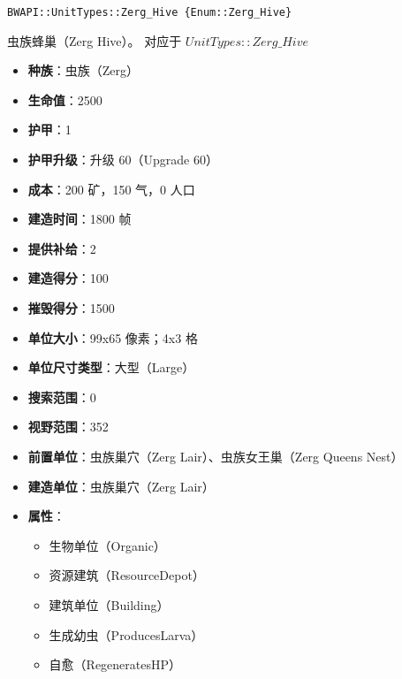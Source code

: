 \begin{tcolorbox}[colback=white, colframe=black!60!white, title=Zerg\_Hive(), arc=0mm]
    \begin{verbatim}
BWAPI::UnitTypes::Zerg_Hive {Enum::Zerg_Hive}
    \end{verbatim}
    虫族蜂巢（Zerg Hive）。
    对应于  $UnitTypes::Zerg\_Hive$ 
    \begin{itemize}
        \item \textbf{种族}：虫族（Zerg）
        \item \textbf{生命值}：2500
        \item \textbf{护甲}：1
        \item \textbf{护甲升级}：升级 60（Upgrade 60）
        \item \textbf{成本}：200 矿，150 气，0 人口
        \item \textbf{建造时间}：1800 帧
        \item \textbf{提供补给}：2
        \item \textbf{建造得分}：100
        \item \textbf{摧毁得分}：1500
        \item \textbf{单位大小}：99x65 像素；4x3 格
        \item \textbf{单位尺寸类型}：大型（Large）
        \item \textbf{搜索范围}：0
        \item \textbf{视野范围}：352
        \item \textbf{前置单位}：虫族巢穴（Zerg Lair）、虫族女王巢（Zerg Queens Nest）
        \item \textbf{建造单位}：虫族巢穴（Zerg Lair）
        \item \textbf{属性}：
            \begin{itemize}
                \item 生物单位（Organic）
                \item 资源建筑（ResourceDepot）
                \item 建筑单位（Building）
                \item 生成幼虫（ProducesLarva）
                \item 自愈（RegeneratesHP）
            \end{itemize}
    \end{itemize}
\end{tcolorbox}

